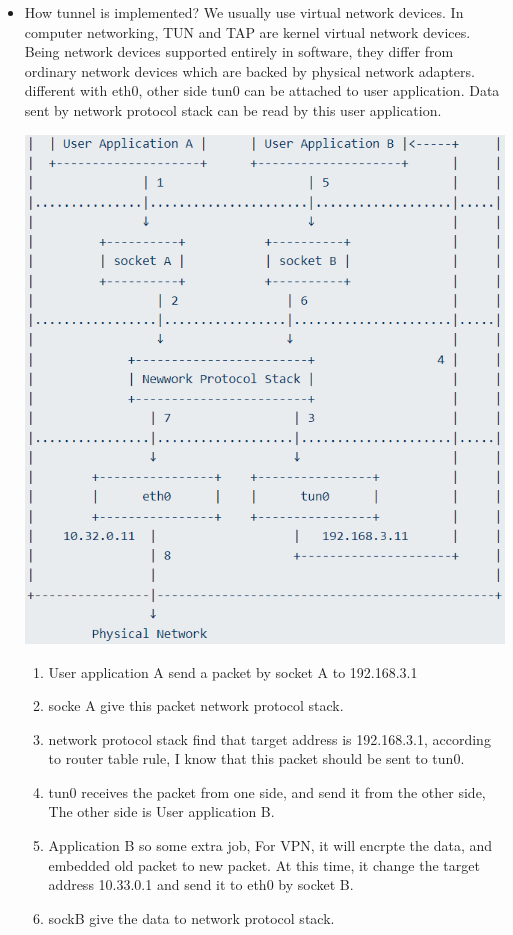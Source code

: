 \documentclass[a4paper,11pt,twoside]{book}
\begin{document}
\begin{itemize}
	\item How tunnel is implemented? We usually use virtual network devices. In computer networking, TUN and TAP are kernel virtual network devices. Being network devices supported entirely in software, they differ from ordinary network devices which are backed by physical network adapters. different with eth0, other side tun0 can be attached to user application. Data sent by network protocol stack can be read by this user application. 
\begin{center}
	\includegraphics[width=0.60\linewidth]{pics/vpn.png}
\end{center}
\begin{enumerate}
	\item User application A send a packet by socket A to 192.168.3.1
	
	\item socke A give this packet network protocol stack.
	
	\item network protocol stack find that target address is 192.168.3.1, according to router table rule, I know that this packet should be sent to tun0. 
	
	\item tun0 receives the packet from one side, and send it from the other side, The other side is User application B. 
	
	\item Application B so some extra job, For VPN, it will encrpte the data, and embedded old packet to new packet. At this time, it change the target address 10.33.0.1 and send it to eth0 by socket B.
	
	\item sockB give the data to network protocol stack.
	

\end{enumerate}
\end{itemize}
\end{document}
